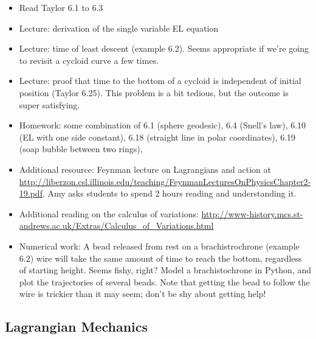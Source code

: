 \documentclass[10pt]{article}
\begin{document}
\begin{itemize}

    \item Read Taylor 6.1 to 6.3
    
    \item Lecture: derivation of the single variable EL equation
    
    \item Lecture: time of least descent (example 6.2). Seems appropriate if we're going to revisit a cycloid curve a few times. 
    
    \item Lecture: proof that time to the bottom of a cycloid is independent of initial position (Taylor 6.25). This problem is a bit tedious, but the outcome is super satisfying. 
    
    \item Homework: some combination of 6.1 (sphere geodesic), 6.4 (Snell's law), 6.10 (EL with one side constant), 6.18 (straight line in polar coordinates), 6.19 (soap bubble between two rings), 

    \item Additional resource: Feynman lecture on Lagrangians and action at \url{http://liberzon.csl.illinois.edu/teaching/FeynmanLecturesOnPhysicsChapter2-19.pdf}. Amy asks students to spend 2 hours reading and understanding it. 

    \item Additional reading on the calculus of variations: \url{http://www-history.mcs.st-andrews.ac.uk/Extras/Calculus_of_Variations.html}

    \item Numerical work: A bead released from rest on a brachistrochrone (example 6.2) wire will take the same amount of time to reach the bottom, regardless of starting height. Seems fishy, right? Model a brachistochrone in Python, and plot the trajectories of several beads. Note that getting the bead to follow the wire is trickier than it may seem; don't be shy about getting help!

\end{itemize}

\subsection*{Lagrangian Mechanics}
\end{document}
